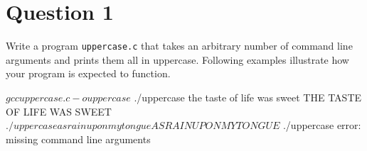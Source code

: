 
\section*{Question 1}

Write a program \texttt{uppercase.c} that takes an arbitrary number of command line arguments and prints them all in uppercase.
Following examples illustrate how your program is expected to function.

\begin{terminal}
$ gcc uppercase.c -o uppercase
$ ./uppercase the taste of life was sweet
THE TASTE OF LIFE WAS SWEET
$ ./uppercase as rain upon my tongue
AS RAIN UPON MY TONGUE
$ ./uppercase
error: missing command line arguments
\end{terminal}
